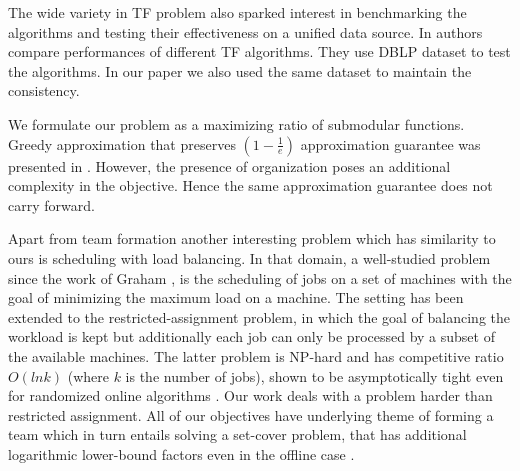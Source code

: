 The wide variety in TF problem also sparked interest in benchmarking the algorithms and testing their effectiveness on a unified data source. In \cite{wang2015comparative} authors compare performances of different TF algorithms. They use DBLP dataset to test the algorithms. In our paper we also used the same dataset to maintain the consistency.

We formulate our problem as a maximizing ratio of submodular functions. Greedy approximation that preserves $( 1 - \frac{1}{e})$ approximation guarantee was presented in \cite{bai2016algorithms}. However, the presence of organization poses an additional complexity in the objective. Hence the same approximation guarantee does not carry forward. 

Apart from team formation another interesting problem which has similarity to ours is scheduling with load balancing. In that domain, a well-studied problem
since the work of Graham \cite{graham1972bounds}, is the scheduling of jobs on
a set of machines with the goal of minimizing the maximum
load on a machine. The setting has been extended to the
restricted-assignment problem, in which the goal of balancing
the workload is kept but additionally each job can only
be processed by a subset of the available machines. The latter
problem is NP-hard and has competitive ratio $O(ln k)$
(where $k$ is the number of jobs), shown to be asymptotically
tight even for randomized online algorithms \cite{aspnes1993line,azar1995competitiveness}. Our
work deals with a problem harder than restricted assignment. All of our objectives have
underlying theme of forming a team which in turn entails solving a set-cover problem, that has additional logarithmic lower-bound factors
even in the offline case \cite{sleator1985amortized}.
